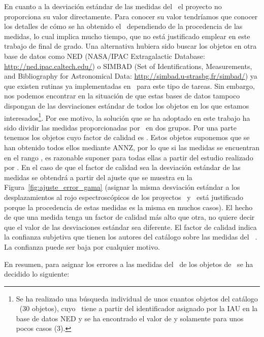En cuanto a la desviación estándar de las medidas del \rt\ el proyecto no proporciona su valor directamente. Para conocer su valor tendríamos que conocer los detalles de cómo se ha obtenido el \rt\ dependiendo de la procedencia de las medidas, lo cual implica mucho tiempo, que no está justificado emplear en este trabajo de final de grado. Una alternativa hubiera sido buscar los objetos en otra base de datos como NED (NASA/IPAC Extragalactic Database: \url{http://ned.ipac.caltech.edu/}) o SIMBAD (Set of Identifications, Measurements, and Bibliography for Astronomical Data: \url{http://simbad.u-strasbg.fr/simbad/}) ya que existen rutinas ya implementadas en \python\ para este tipo de tareas. Sin embargo, nos podemos encontrar en la situación de que estas bases de datos tampoco dispongan de las desviaciones estándar de todos los objetos en los que estamos interesados\footnote{Se ha realizado una búsqueda individual de unos cuantos objetos del catálogo \hatlas\ (30 objetos), cuyo \rt\ tiene  a partir del identificador asignado por la IAU en la base de datos NED y se ha encontrado el valor de  y  solamente para unos pocos casos (3).}. Por ese motivo, la solución que se ha adoptado en este trabajo ha sido dividir las medidas proporcionadas por \hatlas\ en dos grupos. Por una parte tenemos los objetos cuyo factor de calidad es . Estos objetos suponemos que se han obtenido todos ellos mediante ANNZ, por lo que si las medidas se encuentran en el rango , es razonable suponer para todas ellas   a partir del estudio realizado por \cite{article:annz}. En el caso de que el factor de calidad sea  la desviación estándar de las medidas se obtendrá a partir del ajuste que se muestra en la Figura~\ref{fig:ajuste_error_gama} (asignar la misma desviación estándar a los desplazamientos al rojo espectroscópicos de los proyectos \gama\ y \hatlas\ está justificado porque la procedencia de estas medidas es la misma en muchos casos). El hecho de que una medida tenga un factor de calidad más alto que otra, no quiere decir que el valor de las desviaciones estándar sea diferente. El factor de calidad indica la confianza subjetiva que tienen los autores del catálogo sobre las medidas del \rt\ \citep{article:Driver_2011}. La confianza puede ser baja por cualquier motivo.

En resumen, para asignar los errores a las medidas del \rt\ de los objetos de \hatlas\, se ha decidido lo siguiente:

\vspace{-3mm}

